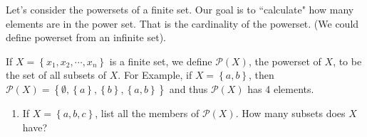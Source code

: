 \documentclass{article}
\begin{document}
Let's consider the powersets of a finite set. Our goal is to ``calculate" how many elements are in the power set. That is the cardinality of the powerset. (We could define powerset from an infinite set).

If $ X = \left\{ x_1, x_2, \cdots, x_n \right\} $ is a finite set, we define $ \mathcal{P}(X) $, the powerset of $ X $, to be the set of all subsets of $ X $. For Example, if $ X = \left\{ a, b \right\} $, then $ \mathcal{P}(X) = \left\{ \emptyset, \left\{ a \right\}, \left\{ b \right\}, \left\{ a, b \right\} \right\} $ and thus $ \mathcal{P}(X) $ has 4 elements.

\begin{enumerate}[label = \textbf{\alph*)}]
	\item If $ X = \left\{ a, b, c \right\} $, list all the members of $ \mathcal{P}(X) $. How many subsets does $ X $ have?
\end{enumerate}
\end{document}
